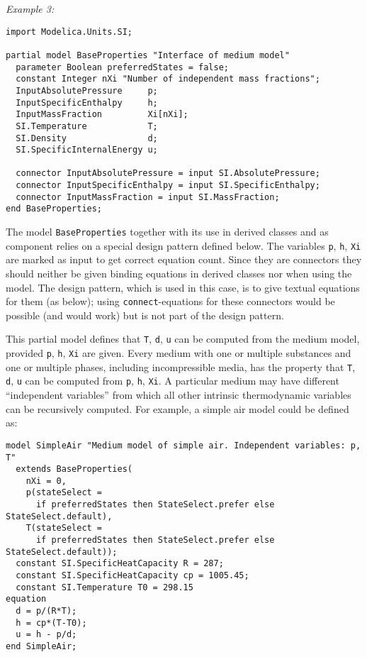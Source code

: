 \begin{example}
\emph{Example 3:}
\begin{lstlisting}[language=modelica]
import Modelica.Units.SI;

partial model BaseProperties "Interface of medium model"
  parameter Boolean preferredStates = false;
  constant Integer nXi "Number of independent mass fractions";
  InputAbsolutePressure     p;
  InputSpecificEnthalpy     h;
  InputMassFraction         Xi[nXi];
  SI.Temperature            T;
  SI.Density                d;
  SI.SpecificInternalEnergy u;

  connector InputAbsolutePressure = input SI.AbsolutePressure;
  connector InputSpecificEnthalpy = input SI.SpecificEnthalpy;
  connector InputMassFraction = input SI.MassFraction;
end BaseProperties;
\end{lstlisting}

The model \lstinline!BaseProperties! together with its use in derived classes and as component relies on a special design pattern defined below.
The variables \lstinline!p!, \lstinline!h!, \lstinline!Xi! are marked as input to get correct equation count.
Since they are connectors they should neither be given binding equations in derived classes nor when using the model.
The design pattern, which is used in this case, is to give textual equations for them (as below); using \lstinline!connect!-equations for these connectors would be possible (and would work) but is not part of the design pattern.

This partial model defines that \lstinline!T!, \lstinline!d!, \lstinline!u! can be computed from the medium model, provided \lstinline!p!, \lstinline!h!, \lstinline!Xi! are given.
Every medium with one or multiple substances and one or multiple phases, including incompressible media, has the property that \lstinline!T!, \lstinline!d!, \lstinline!u! can be computed from \lstinline!p!, \lstinline!h!, \lstinline!Xi!.
A particular medium may have different ``independent variables'' from which all other intrinsic thermodynamic variables can be recursively computed.
For example, a simple air model could be defined as:
\begin{lstlisting}[language=modelica]
model SimpleAir "Medium model of simple air. Independent variables: p, T"
  extends BaseProperties(
    nXi = 0,
    p(stateSelect =
      if preferredStates then StateSelect.prefer else StateSelect.default),
    T(stateSelect =
      if preferredStates then StateSelect.prefer else StateSelect.default));
  constant SI.SpecificHeatCapacity R = 287;
  constant SI.SpecificHeatCapacity cp = 1005.45;
  constant SI.Temperature T0 = 298.15
equation
  d = p/(R*T);
  h = cp*(T-T0);
  u = h - p/d;
end SimpleAir;
\end{lstlisting}


\end{example}
